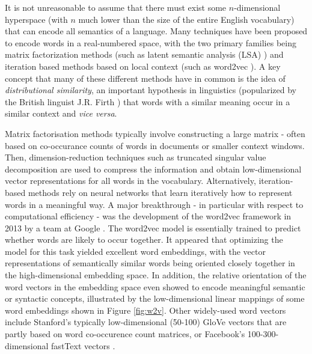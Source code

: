 \documentclass[12pt,a4paper,]{book}
\begin{document}
It is not unreasonable to assume that there must exist some \(n\)-dimensional hyperspace (with \(n\) much lower than the size of the entire English vocabulary) that can encode all semantics of a language. Many techniques have been proposed to encode words in a real-numbered space, with the two primary families being matrix factorization methods (such as latent semantic analysis (LSA) \citep{deerwester1990}) and iteration based methods based on local context (such as word2vec \citep{mikolov2013}). A key concept that many of these different methods have in common is the idea of \emph{distributional similarity}, an important hypothesis in linguistics (popularized by the British linguist J.R. Firth \citep{firth1957}) that words with a similar meaning occur in a similar context and \emph{vice versa}.

Matrix factorisation methods typically involve constructing a large matrix - often based on co-occurance counts of words in documents or smaller context windows. Then, dimension-reduction techniques such as truncated singular value decomposition are used to compress the information and obtain low-dimensional vector representations for all words in the vocabulary. Alternatively, iteration-based methods rely on neural networks that learn iteratively how to represent words in a meaningful way. A major breakthrough - in particular with respect to computational efficiency - was the development of the word2vec framework in 2013 by a team at Google \citep{mikolov2013}. The word2vec model is essentially trained to predict whether words are likely to occur together. It appeared that optimizing the model for this task yielded excellent word embeddings, with the vector representations of semantically similar words being oriented closely together in the high-dimensional embedding space. In addition, the relative orientation of the word vectors in the embedding space even showed to encode meaningful semantic or syntactic concepts, illustrated by the low-dimensional linear mappings of some word embeddings shown in Figure \ref{fig:w2v}. Other widely-used word vectors include Stanford's typically low-dimensional (50-100) GloVe vectors \citep{pennington2014} that are partly based on word co-occurence count matrices, or Facebook's 100-300-dimensional fastText vectors \citep{bojanowski2017, joulin2017}.
\end{document}

